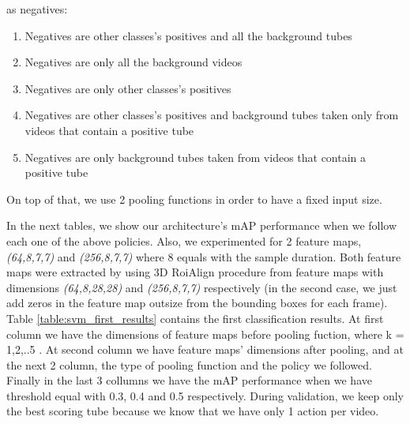 as negatives:
\begin{enumerate}
\item Negatives are other classes's positives and all the background tubes
\item Negatives are only all the background videos
\item Negatives are only other classes's positives
\item Negatives are other classes's positives and background tubes taken only from videos that contain a positive tube
\item Negatives are only background tubes taken from videos that contain a positive tube
\end{enumerate}

On top of that, we use 2 pooling functions in order to have a fixed input size. \par
In the next tables, we show our architecture's  mAP performance when we follow each one of the above policies. Also,
we experimented for 2 feature maps, \textit{(64,8,7,7)} and \textit{(256,8,7,7)} where 8 equals with the sample duration.
Both feature maps were extracted by using 3D RoiAlign procedure from feature maps with dimensions \textit{(64,8,28,28)} and
\textit{(256,8,7,7)} respectively (in the second case, we just add zeros in the feature map outsize from the bounding boxes for
each frame). Table \ref{table:svm_first_results} contains the first classification results. At first column we have the dimensions
of feature maps before pooling fuction, where k = 1,2,..5 . At second column we have feature maps' dimensions after pooling, and at
the next 2 column, the type of pooling function and the policy we followed. Finally in the last 3 collumns we have the mAP performance
when we have threshold equal with 0.3, 0.4 and 0.5 respectively. During validation, we keep only the best scoring tube because we know that
we have only 1 action per video.

